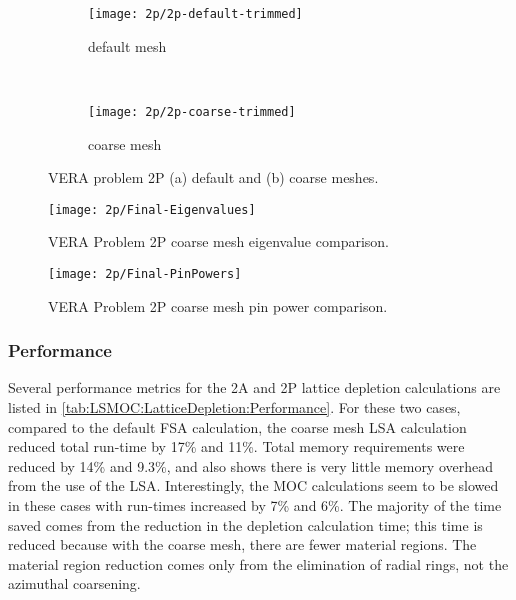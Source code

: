 {{{{{          \begin{figure}[h]
            \centering
            \begin{subfigure}[t]{0.45\textwidth}
                \centering
                \texttt{[image: 2p/2p-default-trimmed]}
                \caption{default mesh\label{fig:LSMOC:2p:Default Mesh}}
            \end{subfigure}%
            ~
            \begin{subfigure}[t]{0.45\textwidth}
                \centering
                \texttt{[image: 2p/2p-coarse-trimmed]}
                \caption{coarse mesh\label{fig:LSMOC:2p:Coarse Mesh}}
            \end{subfigure}
            \caption{VERA problem 2P (a) default and (b) coarse meshes.\label{figs:LSMOC:2p:Meshes}}
          \end{figure}

          \begin{figure}
            \centering
            \texttt{[image: 2p/Final-Eigenvalues]}
            \caption{VERA Problem 2P coarse mesh eigenvalue comparison. \label{fig:LSMOC:2P:Coarse Mesh:Eigenvalues}}
          \end{figure}
          \begin{figure}
            \centering
            \texttt{[image: 2p/Final-PinPowers]}
            \caption{VERA Problem 2P coarse mesh pin power comparison. \label{fig:LSMOC:2P:Coarse Mesh:PinPowers}}
          \end{figure}
        }
      }

      \subsubsection{Performance}{\label{sssec:Performance}
        Several performance metrics for the 2A and 2P lattice depletion calculations are listed in \cref{tab:LSMOC:LatticeDepletion:Performance}.
        For these two cases, compared to the default \ac{FSA} calculation, the coarse mesh \ac{LSA} calculation reduced total run-time by 17\% and 11\%.
        Total memory requirements were reduced by 14\% and 9.3\%, and also shows there is very little memory overhead from the use of the \ac{LSA}.
        Interestingly, the \ac{MOC} calculations seem to be slowed in these cases with run-times increased by 7\% and 6\%.
        The majority of the time saved comes from the reduction in the depletion calculation time; this time is reduced because with the coarse mesh, there are fewer material regions.
        The material region reduction comes only from the elimination of radial rings, not the azimuthal coarsening.

}}}}

